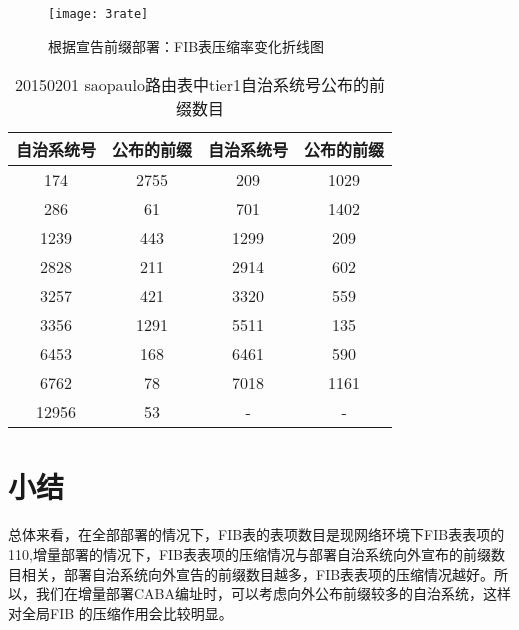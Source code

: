 \begin{figure}
  \centering
  \texttt{[image: 3rate]}
  \caption{根据宣告前缀部署：FIB表压缩率变化折线图}
  \label{fig:3rate}
\end{figure}


\begin{table}
    \centering
    \caption{20150201 saopaulo路由表中tier1自治系统号公布的前缀数目}
    \label{tab:tier1asnprefix}
    \begin{tabular}{|c|c|c|c|}
    \hline
    自治系统号 & 公布的前缀 & 自治系统号 & 公布的前缀  \\ \hline
    174 & 2755 &209 & 1029 \\ \hline
    286 & 61  & 701 & 1402\\ \hline
    1239 & 443 & 1299 &209 \\ \hline
    2828 & 211 & 2914 & 602\\ \hline
    3257 & 421 & 3320 & 559\\ \hline
    3356 & 1291 & 5511 & 135\\ \hline
    6453 & 168 &  6461 & 590\\ \hline
    6762 & 78  & 7018 & 1161\\ \hline
    12956 & 53 & - & -\\ \hline
    \end{tabular}
\end{table}

\section{小结}
总体来看，在全部部署的情况下，FIB表的表项数目是现网络环境下FIB表表项的1\/10,增量部署的情况下，FIB表表项的压缩情况与部署自治系统向外宣布的前缀数目相关，部署自治系统向外宣告的前缀数目越多，FIB表表项的压缩情况越好。所以，我们在增量部署CABA编址时，可以考虑向外公布前缀较多的自治系统，这样对全局FIB 的压缩作用会比较明显。
